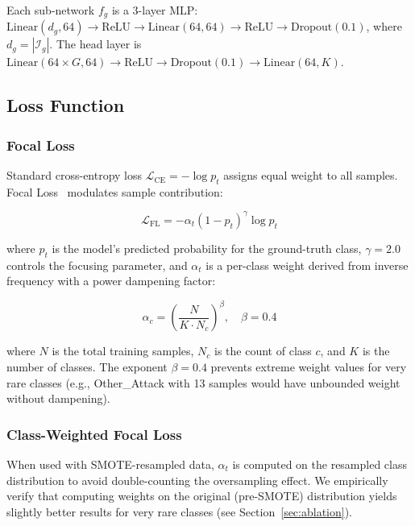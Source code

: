 \documentclass[12pt]{article}
\begin{document}
Each sub-network $f_g$ is a 3-layer MLP: $\text{Linear}(d_g, 64) \to \text{ReLU} \to \text{Linear}(64, 64) \to \text{ReLU} \to \text{Dropout}(0.1)$, where $d_g = |\mathcal{I}_g|$. The head layer is $\text{Linear}(64 \times G, 64) \to \text{ReLU} \to \text{Dropout}(0.1) \to \text{Linear}(64, K)$.

\subsection{Loss Function}
\label{subsec:loss}

\subsubsection{Focal Loss}
Standard cross-entropy loss $\mathcal{L}_{\text{CE}} = -\log p_t$ assigns equal weight to all samples. Focal Loss~\cite{lin2017focal} modulates sample contribution:

\begin{equation}
    \mathcal{L}_{\text{FL}} = -\alpha_t (1 - p_t)^\gamma \log p_t
    \label{eq:focal}
\end{equation}

\noindent where $p_t$ is the model's predicted probability for the ground-truth class, $\gamma = 2.0$ controls the focusing parameter, and $\alpha_t$ is a per-class weight derived from inverse frequency with a power dampening factor:

\begin{equation}
    \alpha_c = \left(\frac{N}{K \cdot N_c}\right)^\beta, \quad \beta = 0.4
    \label{eq:alpha}
\end{equation}

\noindent where $N$ is the total training samples, $N_c$ is the count of class $c$, and $K$ is the number of classes. The exponent $\beta = 0.4$ prevents extreme weight values for very rare classes (e.g., Other\_Attack with 13 samples would have unbounded weight without dampening).

\subsubsection{Class-Weighted Focal Loss}
When used with SMOTE-resampled data, $\alpha_t$ is computed on the resampled class distribution to avoid double-counting the oversampling effect. We empirically verify that computing weights on the original (pre-SMOTE) distribution yields slightly better results for very rare classes (see Section~\ref{sec:ablation}).
\end{document}
